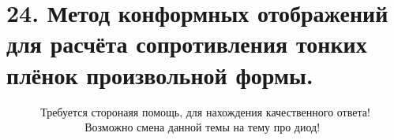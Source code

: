 \section*{24. Метод конформных отображений для расчёта сопротивления тонких
плёнок произвольной формы.}
 
\[\boxed{ \begin{array}{l}
    \text{Требуется сторонаяя помощь, для нахождения качественного ответа!} \\
    \quad\qquad\quad\text{Возможно смена данной темы на тему про диод! }

\end{array}
}
\]


